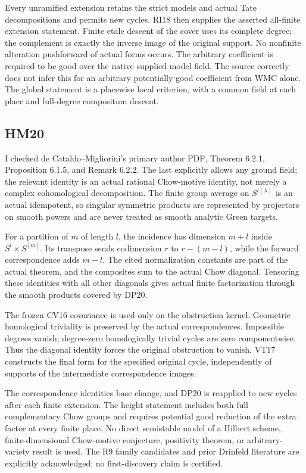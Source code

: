 Every unramified extension retains the strict models and actual Tate
decompositions and permits new cycles. RI18 then supplies the asserted
all-finite extension statement. Finite etale descent of the cover uses
its complete degree; the complement is exactly the inverse image of
the original support. No nonfinite alteration pushforward of actual
forms occurs. The arbitrary coefficient is required to be good over
the native supplied model field. The source correctly does not infer
this for an arbitrary potentially-good coefficient from WMC alone.
The global statement is a placewise local criterion, with a common
field at each place and full-degree compositum descent.

\subsection{HM20}
I checked de Cataldo--Migliorini's primary author PDF, Theorem 6.2.1,
Proposition 6.1.5, and Remark 6.2.2. The last explicitly allows any
ground field; the relevant identity is an actual rational Chow-motive
identity, not merely a complex cohomological decomposition.
The finite group average on $S^{l(\lambda)}$ is an actual idempotent,
so singular symmetric products are represented by projectors on smooth
powers and are never treated as smooth analytic Green targets.

For a partition of $m$ of length $l$, the incidence has dimension
$m+l$ inside $S^l\times S^{[m]}$. Its transpose sends codimension $r$
to $r-(m-l)$, while the forward correspondence adds $m-l$. The cited
normalization constants are part of the actual theorem, and the
composites sum to the actual Chow diagonal. Tensoring these identities
with all other diagonals gives actual finite factorization through
the smooth products covered by DP20.

The frozen CV16 covariance is used only on the obstruction kernel.
Geometric homological triviality is preserved by the actual
correspondences. Impossible degrees vanish; degree-zero homologically
trivial cycles are zero componentwise. Thus the diagonal identity
forces the original obstruction to vanish. VT17 constructs the final
form for the specified original cycle, independently of supports of
the intermediate correspondence images.

The correspondence identities base change, and DP20 is reapplied to
new cycles after each finite extension. The height statement includes
both full complementary Chow groups and requires potential good
reduction of the extra factor at every finite place. No direct
semistable model of a Hilbert scheme, finite-dimensional Chow-motive
conjecture, positivity theorem, or arbitrary-variety result is used.
The R9 family candidates and prior Drinfeld literature are explicitly
acknowledged; no first-discovery claim is certified.

